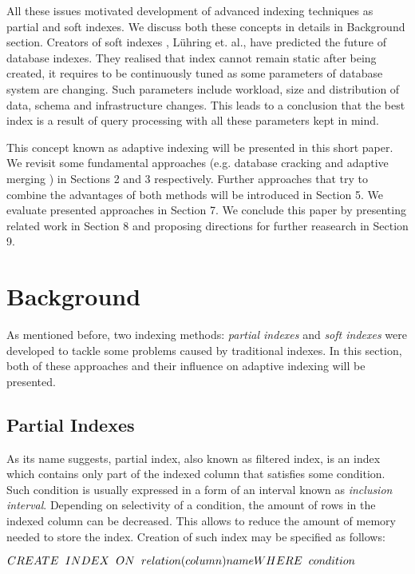 \documentclass[10pt, conference, compsocconf]{IEEEtran}
\begin{document}
All these issues motivated development of advanced indexing techniques as partial and soft indexes. We discuss both these concepts in details in Background section. Creators of soft indexes \cite{soft_indexes}, L\"uhring et. al., have predicted the future of database indexes. They realised that index cannot remain static after being created, it requires to be continuously tuned as some parameters of database system are changing. Such parameters include workload, size and distribution of data, schema and infrastructure changes. This leads to a conclusion that the best index is a result of query processing with all these parameters kept in mind.

This concept known as adaptive indexing will be presented in this short paper. We revisit some fundamental approaches (e.g. database cracking \cite{cracking} and adaptive merging \cite{merging}) in Sections 2 and 3 respectively. Further approaches that try to combine the advantages of both methods will be introduced in Section 5. We evaluate presented approaches in Section 7. We conclude this paper by presenting related work in Section 8 and proposing directions for further reasearch in Section 9.

\section{Background}
As mentioned before, two indexing methods: \textit{partial indexes} and \textit{soft indexes} were developed to tackle some problems caused by traditional indexes. In this section, both of these approaches and their influence on adaptive indexing will be presented.
\subsection{Partial Indexes}
As its name suggests, partial index, also known as filtered index, is an index which contains only part of the indexed column that satisfies some condition. Such condition is usually expressed in a form of an interval known as \textit{inclusion interval}. Depending on selectivity of a condition, the amount of rows in the indexed column can be decreased. This allows to reduce the amount of memory needed to store the index. Creation of such index may be specified as follows:
\begin{displayquote}
$CREATE \hspace{0.2 cm} INDEX \hspace{0.2 cm} ON \hspace{0.2 cm} relation(column) name \\ WHERE \hspace{0.2 cm} condition$
\end{displayquote}
\end{document}
